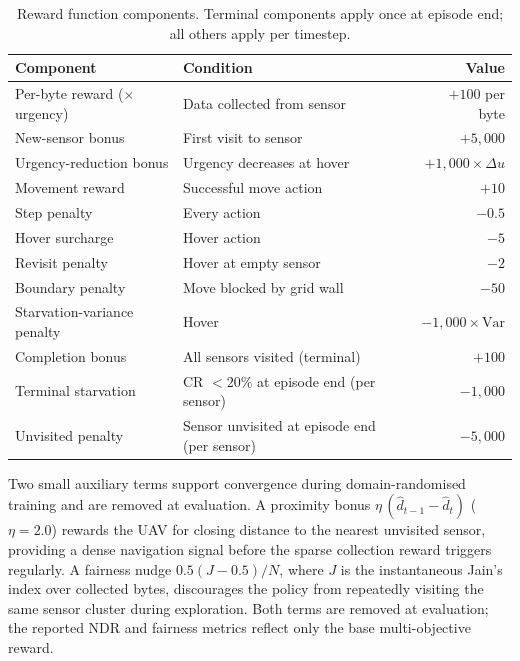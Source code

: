 \begin{table}[H]
\centering
\small
\caption{Reward function components. Terminal components apply once at
episode end; all others apply per timestep.}
\label{tab:reward_components}
\begin{tabularx}{\textwidth}{l X r}
\toprule
\textbf{Component} & \textbf{Condition} & \textbf{Value} \\
\midrule
Per-byte reward ($\times$ urgency) & Data collected from sensor & $+100$ per byte \\
New-sensor bonus      & First visit to sensor        & $+5{,}000$ \\
Urgency-reduction bonus & Urgency decreases at hover & $+1{,}000 \times \Delta u$ \\
Movement reward       & Successful move action       & $+10$ \\
Step penalty          & Every action                 & $-0.5$ \\
Hover surcharge       & Hover action                 & $-5$ \\
Revisit penalty       & Hover at empty sensor        & $-2$ \\
Boundary penalty      & Move blocked by grid wall    & $-50$ \\
Starvation-variance penalty & Hover              & $-1{,}000 \times \mathrm{Var}$ \\
\midrule
Completion bonus      & All sensors visited (terminal) & $+100$ \\
Terminal starvation   & CR $< 20\%$ at episode end (per sensor) & $-1{,}000$ \\
Unvisited penalty     & Sensor unvisited at episode end (per sensor) & $-5{,}000$ \\
\bottomrule
\end{tabularx}
\end{table}

Two small auxiliary terms support convergence during domain-randomised training and are removed at evaluation. A proximity bonus $\eta\,(\hat{d}_{t-1} - \hat{d}_t)$ ($\eta=2.0$) rewards the UAV for closing distance to the nearest unvisited sensor, providing a dense navigation signal before the sparse collection reward triggers regularly. A fairness nudge $0.5(J-0.5)/N$, where $J$ is the instantaneous Jain's index over collected bytes, discourages the policy from repeatedly visiting the same sensor cluster during exploration. Both terms are removed at evaluation; the reported NDR and fairness metrics reflect only the base multi-objective reward.

